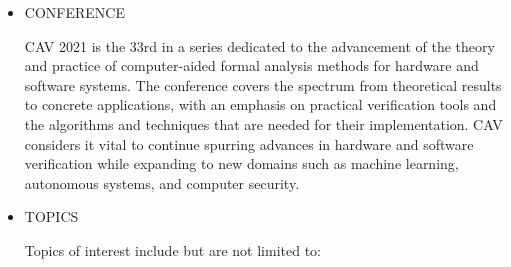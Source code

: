 \documentclass{article}
\begin{document}
\begin{itemize}\item  CONFERENCE 
 
  CAV 2021 is the 33rd in a series dedicated to the advancement of the theory and practice of computer-aided formal analysis methods for hardware and software systems. The conference covers the spectrum from theoretical results to concrete applications, with an emphasis on practical verification tools and the algorithms and techniques that are needed for their implementation. CAV considers it vital to continue spurring advances in hardware and software verification while expanding to new domains such as machine learning, autonomous systems, and computer security.  
 
\item  TOPICS 
 
  Topics of interest include but are not limited to: 
 

\end{itemize}
\end{document}
